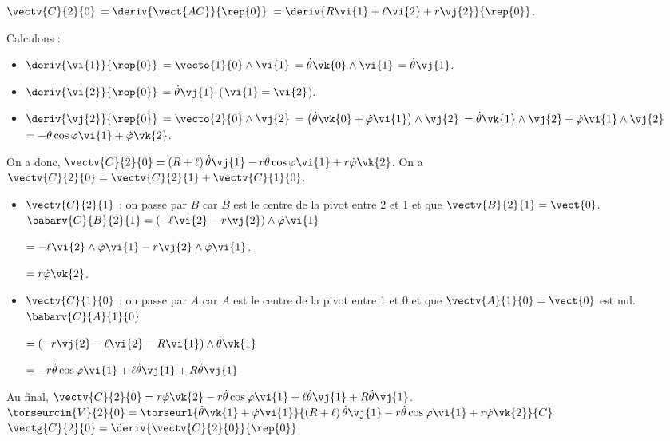\begin{corrigebox}
$\vectv{C}{2}{0}$ 
$=\deriv{\vect{AC}}{\rep{0}}$ 
$=\deriv{R\vi{1}+\ell\vi{2}+r\vj{2}}{\rep{0}}$.

Calculons : 
\begin{itemize}
\item $\deriv{\vi{1}}{\rep{0}}$ $=\vecto{1}{0} \wedge \vi{1}$ $=\dot{\theta}\vk{0} \wedge \vi{1}$ $=\dot{\theta}\vj{1}$.
\item $\deriv{\vi{2}}{\rep{0}}$ $=\dot{\theta}\vj{1}$ ($\vi{1}=\vi{2}$).
\item $\deriv{\vj{2}}{\rep{0}}$ $=\vecto{2}{0} \wedge \vj{2}$ 
$=\left(\dot{\theta}\vk{0}+ \dot{\varphi}\vi{1} \right) \wedge \vj{2}$
$=\dot{\theta}\vk{1} \wedge \vj{2}+ \dot{\varphi}\vi{1}  \wedge \vj{2}$
$=-\dot{\theta}\cos\varphi \vi{1} + \dot{\varphi}\vk{2} $.
\end{itemize}

On a donc, 
$\vectv{C}{2}{0}= \left(R+\ell\right)\dot{\theta}\vj{1} -r\dot{\theta}\cos\varphi \vi{1} + r\dot{\varphi}\vk{2}$.
On a $\vectv{C}{2}{0}= \vectv{C}{2}{1}+\vectv{C}{1}{0}$.
\begin{itemize}
\item $\vectv{C}{2}{1}$ : on passe par $B$ car $B$ est le centre de la pivot entre 2 et 1 et que $\vectv{B}{2}{1}=\vect{0}$. 
$\babarv{C}{B}{2}{1} =\left(-\ell\vi{2}-r\vj{2} \right)\wedge \dot{\varphi}\vi{1} $ 

$=-\ell\vi{2}\wedge \dot{\varphi}\vi{1}-r\vj{2} \wedge \dot{\varphi}\vi{1}$.

$=r\dot{\varphi}\vk{2}$.

\item $\vectv{C}{1}{0}$ : on passe par $A$ car $A$ est le centre de la pivot entre 1 et 0 et que $\vectv{A}{1}{0}=\vect{0}$ est nul. 
$\babarv{C}{A}{1}{0}$ 

$=\left(-r\vj{2}-\ell\vi{2}-R\vi{1}\right)\wedge \dot{\theta}\vk{1}$

$=-r\dot{\theta}\cos\varphi\vi{1}+\ell\dot{\theta}\vj{1}+R\dot{\theta}\vj{1}$ 
\end{itemize}

Au final, 
 $\vectv{C}{2}{0}=r\dot{\varphi}\vk{2}-r\dot{\theta}\cos\varphi\vi{1}+\ell\dot{\theta}\vj{1}+R\dot{\theta}\vj{1}$.
$\torseurcin{V}{2}{0} = \torseurl{\dot{\theta}\vk{1}+ \dot{\varphi}\vi{1}}{\left(R+\ell\right)\dot{\theta}\vj{1} -r\dot{\theta}\cos\varphi \vi{1} + r\dot{\varphi}\vk{2}}{C}$
$\vectg{C}{2}{0} = \deriv{\vectv{C}{2}{0}}{\rep{0}}$
 

\end{corrigebox}
